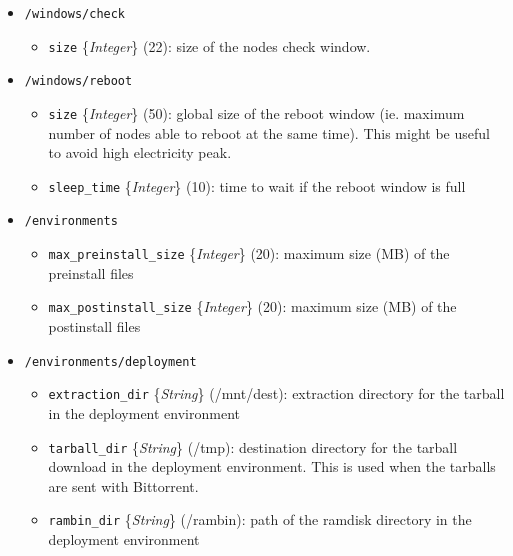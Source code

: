 \documentclass[a4wide,10pt,oneside]{book}
\newcommand{\ypath}[1]{\texttt{#1}}
\newcommand{\yfieldd}[3]{\texttt{#1} {\small\{{\emph{#2}}\}} {\small(}#3{\small)}:}
\begin{document}
\begin{itemize}
  \item \ypath{/windows/check}
  \begin{itemize}
    \item \yfieldd{size}{Integer}{22} size of the nodes check window.
  \end{itemize}

  \item \ypath{/windows/reboot}
  \begin{itemize}
    \item \yfieldd{size}{Integer}{50} global size of the reboot window (ie. maximum number of nodes able to reboot at the same time). This might be useful to avoid high electricity peak.
    \item \yfieldd{sleep\_time}{Integer}{10} time to wait if the reboot window is full
  \end{itemize}

  \item \ypath{/environments}
  \begin{itemize}
    \item \yfieldd{max\_preinstall\_size}{Integer}{20} maximum size (MB) of the preinstall files
    \item \yfieldd{max\_postinstall\_size}{Integer}{20} maximum size (MB) of the postinstall files
  \end{itemize}

  \item \ypath{/environments/deployment}
  \begin{itemize}
    \item \yfieldd{extraction\_dir}{String}{/mnt/dest} extraction directory for the tarball in the deployment environment
    \item \yfieldd{tarball\_dir}{String}{/tmp} destination directory for the tarball download in the deployment environment. This is used when the tarballs are sent with Bittorrent.
    \item \yfieldd{rambin\_dir}{String}{/rambin} path of the ramdisk directory in the deployment environment
  \end{itemize}


\end{itemize}
\end{document}
